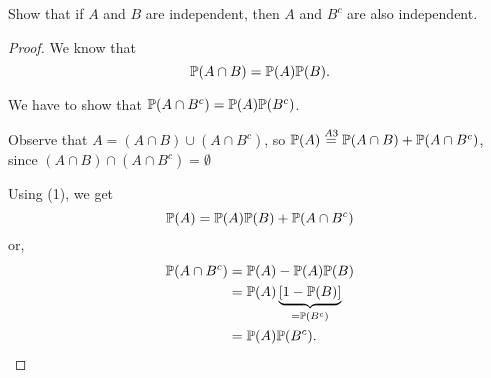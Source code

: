 \documentclass[10pt, a4paper]{article}
\begin{document}
\begin{problem}[68]
    Show that if $A$ and $B$ are independent,
    then $A$ and $B ^ c$ are also independent.
    \begin{proof}
        We know that
        \begin{equation}
            \P(A \cap B) = \P(A)\P(B).
        \end{equation}

        We have to show that $\P(A \cap B ^ c) = \P(A)\P(B ^ c)$.

        Observe that $A = (A \cap B) \cup (A \cap B ^ c)$,
        so $\P(A) \overset{A3}{=} \P(A \cap B) + \P(A \cap B ^ c)$,
        since $(A \cap B) \cap (A \cap B ^ c) = \emptyset$

        Using (1), we get
        \[
        \P(A) = \P(A)\P(B) + \P(A \cap B ^ c)
        \]
        or,
        \begin{align*}
            \P(A \cap B ^ c) &= \P(A) - \P(A)\P(B) \\
            &= \P(A)\underbrace{\left[1 - \P(B)\right]}_{= \P(B ^ c)} \\
            &= \P(A)\P(B ^ c).
        \end{align*}
    \end{proof}
\end{problem}
\end{document}
